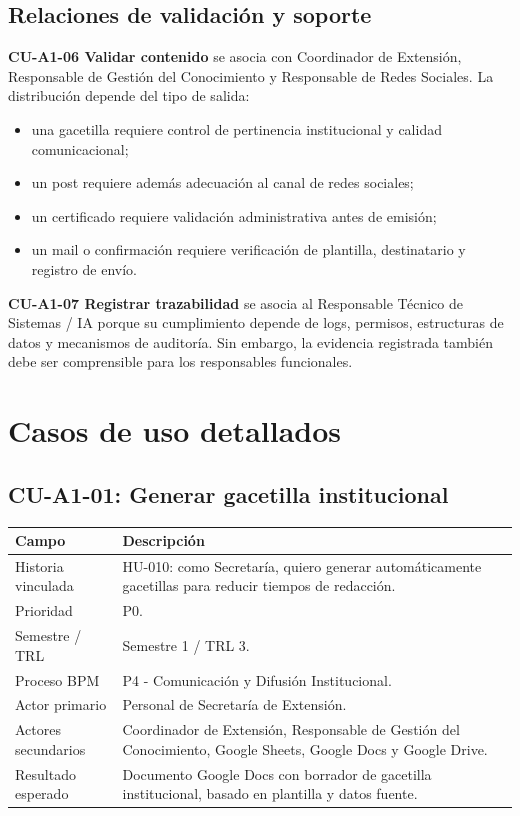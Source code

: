 \documentclass[11pt,a4paper]{article}
\newcommand{\caso}[1]{\textbf{\textcolor{FieBlue}{#1}}}
\begin{document}
\subsection{Relaciones de validación y soporte}

\caso{CU-A1-06 Validar contenido} se asocia con Coordinador de Extensión, Responsable de Gestión del Conocimiento y Responsable de Redes Sociales. La distribución depende del tipo de salida:

\begin{itemize}
  \item una gacetilla requiere control de pertinencia institucional y calidad comunicacional;
  \item un post requiere además adecuación al canal de redes sociales;
  \item un certificado requiere validación administrativa antes de emisión;
  \item un mail o confirmación requiere verificación de plantilla, destinatario y registro de envío.
\end{itemize}

\caso{CU-A1-07 Registrar trazabilidad} se asocia al Responsable Técnico de Sistemas / IA porque su cumplimiento depende de logs, permisos, estructuras de datos y mecanismos de auditoría. Sin embargo, la evidencia registrada también debe ser comprensible para los responsables funcionales.

\section{Casos de uso detallados}

\subsection{CU-A1-01: Generar gacetilla institucional}

\begin{tabularx}{\textwidth}{p{}Y}
\toprule
\textbf{Campo} & \textbf{Descripción} \\
\midrule
Historia vinculada & HU-010: como Secretaría, quiero generar automáticamente gacetillas para reducir tiempos de redacción. \\
Prioridad & P0. \\
Semestre / TRL & Semestre 1 / TRL 3. \\
Proceso BPM & P4 - Comunicación y Difusión Institucional. \\
Actor primario & Personal de Secretaría de Extensión. \\
Actores secundarios & Coordinador de Extensión, Responsable de Gestión del Conocimiento, Google Sheets, Google Docs y Google Drive. \\
Resultado esperado & Documento Google Docs con borrador de gacetilla institucional, basado en plantilla y datos fuente. \\
\bottomrule
\end{tabularx}
\end{document}
